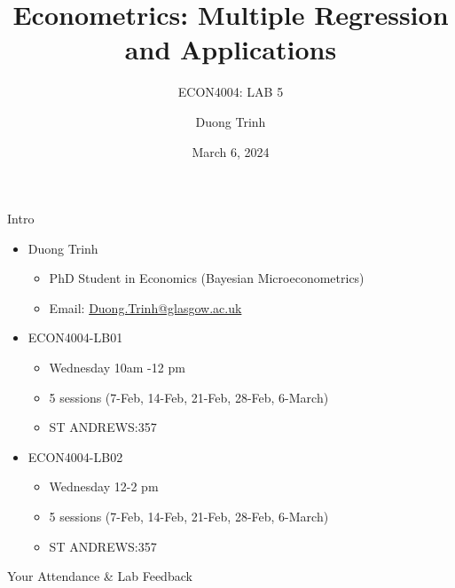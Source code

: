 \documentclass[
  10pt,
  ignorenonframetext,
]{beamer}
\title{Econometrics: Multiple Regression and Applications}
\subtitle{ECON4004: LAB 5}
\author{Duong Trinh}
\date{March 6, 2024}
\institute{University of Glasgow}
\providecommand{\tightlist}{%
  \setlength{\itemsep}{0pt}\setlength{\parskip}{0pt}}
\begin{document}
\frame{\titlepage}

\begin{frame}{Intro}
\protect\hypertarget{intro}{}
\begin{itemize}
\tightlist
\item
  Duong Trinh

  \begin{itemize}
  \tightlist
  \item
    PhD Student in Economics (Bayesian Microeconometrics)
  \item
    Email: \underline{Duong.Trinh@glasgow.ac.uk}
  \end{itemize}
\end{itemize}

\vspace{3mm}

\begin{itemize}
\tightlist
\item
  ECON4004-LB01

  \begin{itemize}
  \tightlist
  \item
    Wednesday 10am -12 pm
  \item
    5 sessions (7-Feb, 14-Feb, 21-Feb, 28-Feb, 6-March)
  \item
    ST ANDREWS:357
  \end{itemize}
\item
  ECON4004-LB02

  \begin{itemize}
  \tightlist
  \item
    Wednesday 12-2 pm
  \item
    5 sessions (7-Feb, 14-Feb, 21-Feb, 28-Feb, 6-March)
  \item
    ST ANDREWS:357
  \end{itemize}
\end{itemize}
\end{frame}

\begin{frame}{Your Attendance \& Lab Feedback}
\protect\hypertarget{your-attendance-lab-feedback}{}
\end{frame}
\end{document}
